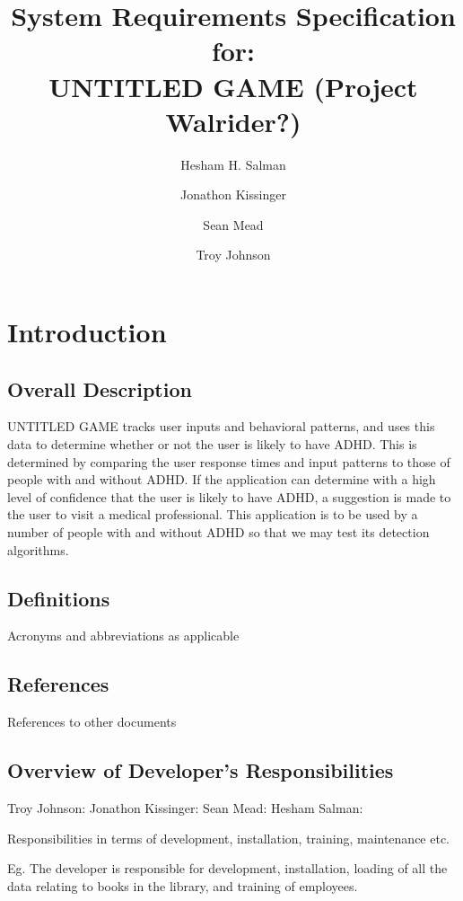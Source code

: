 \documentclass[a4wide]{article}
\title{System Requirements Specification for:\\ UNTITLED GAME (Project Walrider?)}
\author{Hesham H. Salman \and Jonathon Kissinger \and Sean Mead \and Troy Johnson}
\begin{document}
\maketitle

\section{Introduction}

\subsection{Overall Description}

UNTITLED GAME tracks user inputs and behavioral patterns, and uses this data to determine whether or not the user is likely to have ADHD. This is determined by comparing the user response times and input patterns to those of people with and without ADHD. If the application can determine with a high level of confidence that the user is likely to have ADHD, a suggestion is made to the user to visit a medical professional. \newline \newline
This application is to be used by a number of people with and without ADHD so that we may test its detection algorithms.

\subsection{Definitions}

Acronyms and abbreviations as applicable

\subsection{References}

References to other documents

\subsection{Overview of Developer's Responsibilities}


Troy Johnson:
Jonathon Kissinger:
Sean Mead:
Hesham Salman:

Responsibilities in terms of development, installation, training, maintenance
etc.

Eg. The developer is responsible for development, installation,
loading of all the data relating to books in the library,
and training of employees.
\end{document}
